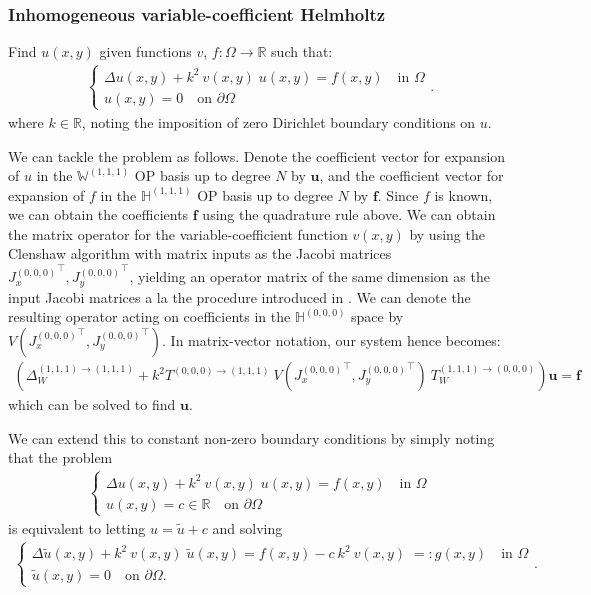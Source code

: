 \documentclass[11pt, oneside]{article}   	%
\newcommand{\R}{\mathbb{R}}
\newcommand{\hdop}{H}
\newcommand{\bighdopiii}{{\mathbb{\hdop}^{(1,1,1)}}}
\newcommand{\bighdopooo}{{\mathbb{\hdop}^{(0,0,0)}}}
\newcommand{\laplacewiii}{\Delta_W^{(1,1,1)\to(1,1,1)}}
\newcommand{\bigWiii}{{\mathbb{W}^{(1,1,1)}}}
\begin{document}
\subsubsection{Inhomogeneous variable-coefficient Helmholtz}

Find \(u(x,y)\) given functions $v$, $f : \Omega \to \R$ such that:
\begin{align}
	\begin{cases}
    		\Delta u(x,y) + k^2 \: v(x,y) \; u(x,y) = f(x,y) \quad \text{in } \Omega \\
		u(x,y) = 0 \quad \text{on } \partial \Omega
	\end{cases}.
	\label{eqn:helmholtz}
\end{align}
where $k \in \R$, noting the imposition of zero Dirichlet boundary conditions on $u$.

We can tackle the problem as follows. Denote the coefficient vector for expansion of $u$ in the $\bigWiii$ OP basis up to degree $N$ by $\mathbf{u}$, and the coefficient vector for expansion of $f$ in the $\bighdopiii$ OP basis up to degree $N$ by $\mathbf{f}$. Since $f$ is known, we can obtain  the coefficients $\mathbf{f}$ using the quadrature rule above. We can obtain the matrix operator for the variable-coefficient function $v(x,y)$ by using the Clenshaw algorithm with matrix inputs as the Jacobi matrices ${J_x^{(0,0,0)}}^\top, {J_y^{(0,0,0)}}^\top$, yielding an operator matrix of the same dimension as the input Jacobi matrices a la the procedure introduced in \cite{olver2019triangle}. We can denote the resulting operator acting on coefficients in the $\bighdopooo$ space by $V({J_x^{(0,0,0)}}^\top, {J_y^{(0,0,0)}}^\top)$. In matrix-vector notation, our system hence becomes:
\begin{align*}
    (\laplacewiii + k^2 T^{(0,0,0)\to(1,1,1)} \: V({J_x^{(0,0,0)}}^\top, {J_y^{(0,0,0)}}^\top) \: T_W^{(1,1,1)\to(0,0,0)}) \mathbf{u} = \mathbf{f}
\end{align*}
which can be solved to find $\mathbf{u}$.

We can extend this to constant non-zero boundary conditions by simply noting that the problem 
\begin{align*}
	\begin{cases}
    		\Delta u(x,y) + k^2 \: v(x,y) \; u(x,y) = f(x,y) \quad \text{in } \Omega \\
		u(x,y) = c \in \R \quad \text{on } \partial \Omega
	\end{cases}
\end{align*}
is equivalent to letting $u = \tilde{u} + c$ and solving
\begin{align*}
	\begin{cases}
    		\Delta \tilde{u}(x,y) + k^2 \: v(x,y) \; \tilde{u}(x,y) = f(x,y) - c \: k^2 \: v(x,y) \; =: g(x,y)  \quad \text{in } \Omega \\
		\tilde{u}(x,y) = 0 \quad \text{on } \partial \Omega.
	\end{cases}.
\end{align*}
\end{document}
